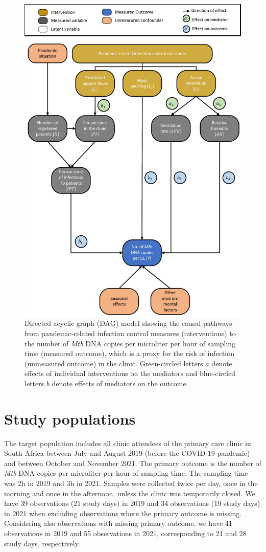 \documentclass{article}
\begin{document}
\begin{figure}[!htpb]
    \centering
    \caption{Directed acyclic graph (DAG) model showing the causal pathways from pandemic-related infection control measures (interventions) to the number of \emph{Mtb} DNA copies per microliter per hour of sampling time (measured outcome), which is a proxy for the risk of infection (unmeasured outcome) in the clinic. Green-circled letters $a$ denote effects of individual interventions on the mediators and blue-circled letters $b$ denote effects of mediators on the outcome.}
    \label{fig:dag}
    \includegraphics[width=.8\linewidth]{dag.pdf}
\end{figure}
	
\section{Study populations}

The target population includes all clinic attendees of the primary care clinic in South Africa between July and August 2019 (before the COVID-19 pandemic) and between October and November 2021. The primary outcome is the number of \emph{Mtb} DNA copies per microliter per hour of sampling time. The sampling time was 2h in 2019 and 3h in 2021. Samples were collected twice per day, once in the morning and once in the afternoon, unless the clinic was temporarily closed. We have 39 observations (21 study days) in 2019 and 34 observations (19 study days) in 2021 when excluding observations where the primary outcome is missing. Considering also observations with missing primary outcome, we have 41 observations in 2019 and 55 observations in 2021, corresponding to 21 and 28 study days, respectively. 
\end{document}
